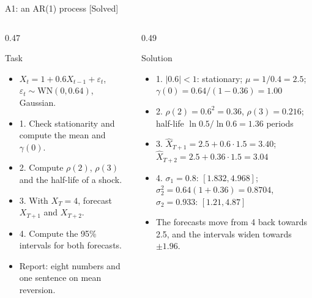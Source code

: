 \begin{frame}{A1: an AR(1) process [Solved]}
\itemsize{\scriptsize}
\begin{columns}[T]
\begin{column}{0.47\textwidth}
\begin{block}{Task}
\begin{itemize}
    \item $X_t = 1 + 0.6X_{t-1} + \varepsilon_t$, $\varepsilon_t \sim \mathrm{WN}(0, 0.64)$, Gaussian.
    \item 1. Check stationarity and compute the mean and $\gamma(0)$.
    \item 2. Compute $\rho(2)$, $\rho(3)$ and the half-life of a shock.
    \item 3. With $X_T = 4$, forecast $X_{T+1}$ and $X_{T+2}$.
    \item 4. Compute the 95\% intervals for both forecasts.
    \item Report: eight numbers and one sentence on mean reversion.
\end{itemize}
\end{block}
\end{column}
\begin{column}{0.49\textwidth}
\begin{exampleblock}{Solution}
\begin{itemize}
    \item 1. $|0.6| < 1$: stationary; $\mu = 1/0.4 = 2.5$; $\gamma(0) = 0.64/(1 - 0.36) = 1.00$
    \item 2. $\rho(2) = 0.6^2 = 0.36$, $\rho(3) = 0.216$; half-life $\ln 0.5/\ln 0.6 = 1.36$ periods
    \item 3. $\hat X_{T+1} = 2.5 + 0.6 \cdot 1.5 = 3.40$; $\hat X_{T+2} = 2.5 + 0.36 \cdot 1.5 = 3.04$
    \item 4. $\sigma_1 = 0.8$: $[1.832, 4.968]$; $\sigma_2^2 = 0.64(1 + 0.36) = 0.8704$, $\sigma_2 = 0.933$: $[1.21, 4.87]$
    \item The forecasts move from 4 back towards 2.5, and the intervals widen towards $\pm 1.96$.
\end{itemize}
\end{exampleblock}
\end{column}
\end{columns}
\end{frame}

